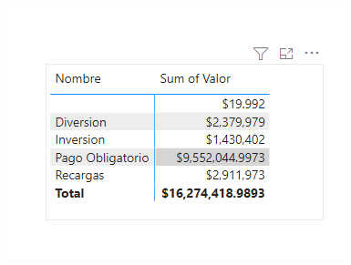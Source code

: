 \begin{figure}[H]
    \centering
    \includegraphics[scale=0.6]{Data/datafig2.png}
\end{figure}










